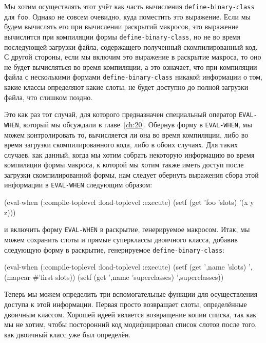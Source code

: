 Мы хотим осуществлять этот учёт как часть вычисления \lstinline{define-binary-class} для
\lstinline{foo}. Однако не совсем очевидно, куда поместить это выражение. Если мы будем
вычислять его при вычислении раскрытий макросов, это выражение вычислится при компиляции
формы \lstinline{define-binary-class}, но не во время последующей загрузки файла, содержащего
полученный скомпилированный код. С другой стороны, если мы включим это выражение в
раскрытие макроса, то оно не будет вычисляться во время компиляции, а это означает, что
при компиляции файла с несколькими формами \lstinline{define-binary-class} никакой информации о
том, какие классы определяют какие слоты, не будет доступно до полной загрузки файла, что
слишком поздно.

Это как раз тот случай, для которого предназначен специальный оператор \lstinline{EVAL-WHEN},
который мы обсуждали в главе~\ref{ch:20}. Обернув форму в \lstinline{EVAL-WHEN}, мы можем
контролировать то, вычисляется ли она во время компиляции, либо во время загрузки
скомпилированного кода, либо в обоих случаях. Для таких случаев, как данный, когда мы
хотим собрать некоторую информацию во время компиляции формы макроса, к которой мы хотим
также иметь доступ после загрузки скомпилированной формы, нам следует обернуть выражения
сбора этой информации в \lstinline{EVAL-WHEN} следующим образом:

\begin{myverb}
(eval-when (:compile-toplevel :load-toplevel :execute)
  (setf (get 'foo 'slots) '(x y z)))
\end{myverb}

\noindent{}и включить форму \lstinline{EVAL-WHEN} в раскрытие, генерируемое макросом. Итак, мы можем
сохранить слоты и прямые суперклассы двоичного класса, добавив следующую форму в раскрытие,
генерируемое \lstinline{define-binary-class}:

\begin{myverb}
(eval-when (:compile-toplevel :load-toplevel :execute)
  (setf (get ',name 'slots) ',(mapcar #'first slots))
  (setf (get ',name 'superclasses) ',superclasses))
\end{myverb}

Теперь мы можем определить три вспомогательные функции для осуществления доступа к этой
информации. Первая просто возвращает слоты, определённые двоичным классом. Хорошей идеей
является возвращение копии списка, так как мы не хотим, чтобы посторонний код
модифицировал список слотов после того, как двоичный класс уже был определён.

